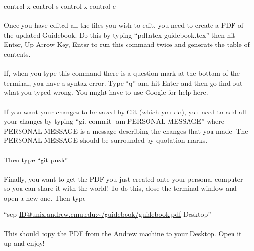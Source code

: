 control-x control-s control-x control-c
\\\\
Once you have edited all the files you wish to edit, you need to create a PDF
of the updated Guidebook. Do this by typing ``pdflatex guidebook.tex'' then
hit Enter, Up Arrow Key, Enter to run this command twice and generate the
table of contents.
\\\\
If, when you type this command there is a question mark at the bottom of
the terminal, you have a syntax error. Type ``q'' and hit Enter and then
go find out what you typed wrong. You might have to use Google for help here.
\\\\
If you want your changes to be saved by Git (which you do), you need
to add all your changes by typing ``git commit -am PERSONAL MESSAGE''
where PERSONAL MESSAGE is a message describing the changes that you made.
The PERSONAL MESSAGE should be surrounded by quotation marks.
\\\\
Then type ``git push''
\\\\
Finally, you want to get the PDF you just created onto your personal computer
so you can share it with the world! To do this, close the terminal window and
open a new one. Then type

``scp \url{ID@unix.andrew.cmu.edu:~/guidebook/guidebook.pdf} Desktop''
\\\\
This should copy the PDF from the Andrew machine to your Desktop. Open it up
and enjoy!
